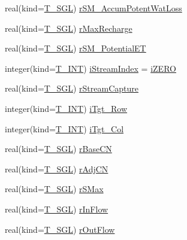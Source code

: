 \begin{DoxyCompactItemize}
\item 
real(kind=\hyperlink{namespacetest_a04d8b9090502de3a00046fe904bc3d99}{T\_\-SGL}) \hyperlink{typetest_1_1_t___c_e_l_l_acc89bea06c2701ca3be2d1d64ae332c7}{rSM\_\-AccumPotentWatLoss}
\item 
real(kind=\hyperlink{namespacetest_a04d8b9090502de3a00046fe904bc3d99}{T\_\-SGL}) \hyperlink{typetest_1_1_t___c_e_l_l_aab9340e6ec07642dd2e6766cf868f5fd}{rMaxRecharge}
\item 
real(kind=\hyperlink{namespacetest_a04d8b9090502de3a00046fe904bc3d99}{T\_\-SGL}) \hyperlink{typetest_1_1_t___c_e_l_l_ac598aca037df15f6a7613204732cc38f}{rSM\_\-PotentialET}
\item 
integer(kind=\hyperlink{namespacetest_a6f91ebd89b58cfcc5da99faed9385c1e}{T\_\-INT}) \hyperlink{typetest_1_1_t___c_e_l_l_a41caa3a0237d549e0c76e53b3cb0aef3}{iStreamIndex} = \hyperlink{namespacetest_a3014c474a511a7853327d17f396fea73}{iZERO}
\item 
real(kind=\hyperlink{namespacetest_a04d8b9090502de3a00046fe904bc3d99}{T\_\-SGL}) \hyperlink{typetest_1_1_t___c_e_l_l_a3d41df1889d6a97b0770b3959f3f811e}{rStreamCapture}
\item 
integer(kind=\hyperlink{namespacetest_a6f91ebd89b58cfcc5da99faed9385c1e}{T\_\-INT}) \hyperlink{typetest_1_1_t___c_e_l_l_aaa0054fea2f69d0209c244ce4fd5ea92}{iTgt\_\-Row}
\item 
integer(kind=\hyperlink{namespacetest_a6f91ebd89b58cfcc5da99faed9385c1e}{T\_\-INT}) \hyperlink{typetest_1_1_t___c_e_l_l_a9a7265d7a24a0a3c536d50a3caf43e1c}{iTgt\_\-Col}
\item 
real(kind=\hyperlink{namespacetest_a04d8b9090502de3a00046fe904bc3d99}{T\_\-SGL}) \hyperlink{typetest_1_1_t___c_e_l_l_a54ef985a5ee67e2b5c6ad06749ab8d43}{rBaseCN}
\item 
real(kind=\hyperlink{namespacetest_a04d8b9090502de3a00046fe904bc3d99}{T\_\-SGL}) \hyperlink{typetest_1_1_t___c_e_l_l_a56f99983fa3f422b1380670aa276d12a}{rAdjCN}
\item 
real(kind=\hyperlink{namespacetest_a04d8b9090502de3a00046fe904bc3d99}{T\_\-SGL}) \hyperlink{typetest_1_1_t___c_e_l_l_a602ff0900c6ce7e2d3ddc87ba21d4de7}{rSMax}
\item 
real(kind=\hyperlink{namespacetest_a04d8b9090502de3a00046fe904bc3d99}{T\_\-SGL}) \hyperlink{typetest_1_1_t___c_e_l_l_acdb8dbdf482542d991a44975edd4b8bc}{rInFlow}
\item 
real(kind=\hyperlink{namespacetest_a04d8b9090502de3a00046fe904bc3d99}{T\_\-SGL}) \hyperlink{typetest_1_1_t___c_e_l_l_a882393c9d8cd06b9a5f634439721505b}{rOutFlow}

\end{DoxyCompactItemize}
